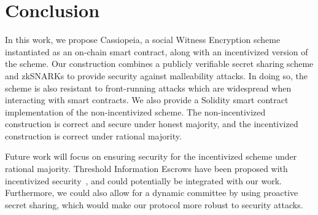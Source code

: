 \section{Conclusion}\label{section:conclusion}
In this work, we propose Cassiopeia, a social Witness Encryption scheme instantiated as an on-chain smart contract, along with an incentivized version of the scheme.
Our construction combines a publicly verifiable secret sharing scheme and zkSNARKs to provide security against malleability attacks.
In doing so, the scheme is also resistant to front-running attacks which are widespread when interacting with smart contracts.
We also provide a Solidity smart contract implementation of the non-incentivized scheme.
The non-incentivized construction is correct and secure under honest majority, and the incentivized construction is correct under rational majority.

Future work will focus on ensuring security for the incentivized scheme under rational majority.
Threshold Information Escrows have been proposed with incentivized security~\cite{watermarking_ot}, and could potentially be integrated with our work.
Furthermore, we could also allow for a dynamic committee by using proactive secret sharing, which would make our protocol more robust to security attacks.